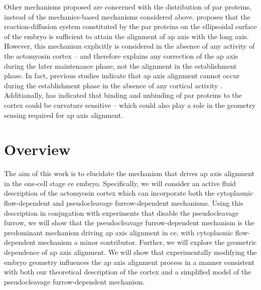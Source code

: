Other mechanisms proposed are concerned with the distribution of \ac{par} proteins, instead of the mechanics-based mechanisms considered above. \cite{gessele2018protein} proposes that the reaction-diffusion system constituted by the \ac{par} proteins on the ellipsoidal surface of the embryo is sufficient to attain the alignment of \ac{ap} axis with the long axis. However, this mechanism explicitly is considered in the absence of any activity of the actomyosin cortex -- and therefore explains any correction of the \ac{ap} axis during the later maintenance phase, not the alignment in the establishment phase. In fact, previous studies indicate that \ac{ap} axis alignment cannot occur during the establishment phase in the absence of any cortical activity \citep{zonies2010symmetry,motegi2011microtubules,tse2012nop1}. Additionally, \citep{klinkert2019aurora} has indicated that binding and unbinding of \ac{par} proteins to the cortex could be curvature sensitive -- which could also play a role in the geometry sensing required for \ac{ap} axis alignment.

\section{Overview}\label{sec:ApAxisOverview}
The aim of this work is to elucidate the mechanism that drives \ac{ap} axis alignment in the one-cell stage \ac{ce} embryo. Specifically, we will consider an active fluid description of the actomyosin cortex which can incorporate both the cytoplasmic flow-dependent and pseudocleavage furrow-dependent mechanisms. Using this description in conjugation with experiments that disable the pseudocleavage furrow, we will show that the pseudocleavage furrow-dependent mechanism is the predominant mechanism driving \ac{ap} axis alignment in \ac{ce}, with cytoplasmic flow-dependent mechanism a minor contributor. Further, we will explore the geometric dependence of \ac{ap} axis alignment. We will show that experimentally modifying the embryo geometry influences the \ac{ap} axis alignment process in a manner consistent with both our theoretical description of the cortex and a simplified model of the pseudocleavage furrow-dependent mechanism. 

